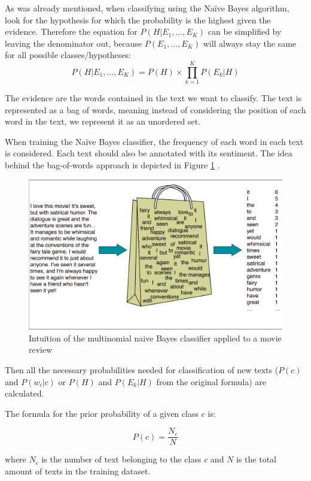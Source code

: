 As was already mentioned, when classifying using the Na\"ive Bayes algorithm, look for the hypothesis for which the probability is the highest given the evidence. Therefore the equation for $P\left(H|E_{1},\ldots,E_{K}\right)$ can be simplified by leaving the denominator out, because $P(E_{1},\ldots,E_{K})$ will always stay the same for all possible classes/hypotheses:
\begin{equation} 
P(H|E_{1},\ldots,E_{K})=P(H)\times\prod_{k=1}^{K}P(E_{k}|H)
\end{equation}


The evidence are the words contained in the text we want to classify. The text is represented as a bag of words, meaning instead of considering the position of each word in the text, we represent it as an unordered set.

When training the Na\"ive Bayes classifier, the frequency of each word in each text is considered. Each text should also be annotated with its sentiment. The idea behind the bag-of-words approach is depicted in Figure \ref{img02:bof}
.
   \begin{figure}[htbp!]\centering
\includegraphics[width=.66\textwidth]{img/bagofwords}
      \caption[Intuition of the multinomial naive Bayes classifier applied to a movie review]{Intuition of the multinomial naive Bayes classifier applied to a movie review  \cite{bagofwords}}\label{img02:bof}
    \end{figure}


Then all the necessary probabilities needed for classification of new texts ($P(c)$ and $P(w_{i}|c)$ or $P(H)$ and $P(E_{k}|H)$ from the original formula) are calculated.

The formula for the prior probability of a given class $c$ is:

\begin{equation} 
P(c) = \frac{N_{c}}{N}
\end{equation}

where $N_{c}$ is the number of text belonging to the class $c$ and $N$ is the total amount of texts in the training dataset.

